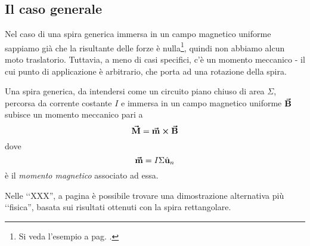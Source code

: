 \subsection{Il caso generale}
Nel caso di una spira generica immersa in un campo magnetico uniforme sappiamo già che la risultante delle forze è nulla\footnote{Si veda l'esempio a pag. \pageref{RisultateSpiraNulla}.}, quindi non abbiamo alcun moto traslatorio. Tuttavia, a meno di casi specifici, c'è un momento meccanico - il cui punto di applicazione è arbitrario, che porta ad una rotazione della spira.
\begin{theorema}
	Una spira generica, da intendersi come un circuito piano chiuso di area $\Sigma$, percorsa da corrente costante $I$ e immersa in un campo magnetico uniforme $\vb*{\va{B}}$ subisce un momento meccanico pari a
	\begin{equation}
		\vb*{\va{M}}=\vb*{\va{m}}\cross\vb*{\va{B}}
	\end{equation}
	dove
	\begin{equation}
		\vb*{\va{m}}=I\Sigma\hat{\mathbf{u}}_n
	\end{equation}
	è il \textit{momento magnetico} associato ad essa.
\end{theorema}
\begin{observe}
	Nelle ‘‘XXX'', a pagina \pageref{XXX} è possibile trovare una dimostrazione alternativa più ‘‘fisica'', basata sui risultati ottenuti con la spira rettangolare.
\end{observe}
